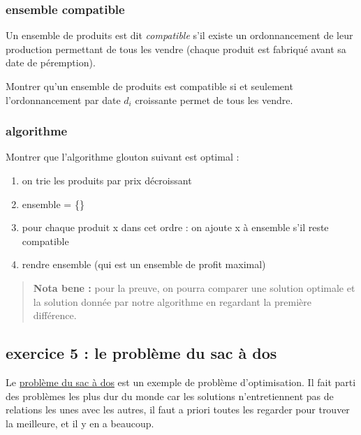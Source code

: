 \documentclass[
]{article}
\providecommand{\tightlist}{%
  \setlength{\itemsep}{0pt}\setlength{\parskip}{0pt}}
\begin{document}
\hypertarget{ensemble-compatible}{%
\subsubsection{ensemble compatible}\label{ensemble-compatible}}

Un ensemble de produits est dit \emph{compatible} s'il existe un
ordonnancement de leur production permettant de tous les vendre (chaque
produit est fabriqué avant sa date de péremption).

Montrer qu'un ensemble de produits est compatible si et seulement
l'ordonnancement par date \(d_i\) croissante permet de tous les vendre.

\hypertarget{algorithme}{%
\subsubsection{algorithme}\label{algorithme}}

Montrer que l'algorithme glouton suivant est optimal :

\begin{enumerate}
\def\labelenumi{\arabic{enumi}.}
\tightlist
\item
  on trie les produits par prix décroissant
\item
  ensemble = \{\}
\item
  pour chaque produit x dans cet ordre : on ajoute x à ensemble s'il
  reste compatible
\item
  rendre ensemble (qui est un ensemble de profit maximal)
\end{enumerate}

\begin{quote}
\textbf{Nota bene :} pour la preuve, on pourra comparer une solution
optimale et la solution donnée par notre algorithme en regardant la
première différence.
\end{quote}

\hypertarget{exercice-5-le-probluxe8me-du-sac-uxe0-dos}{%
\subsection{exercice 5 : le problème du sac à
dos}\label{exercice-5-le-probluxe8me-du-sac-uxe0-dos}}

Le
\href{https://fr.wikipedia.org/wiki/Probl\%C3\%A8me_du_sac_\%C3\%A0_dos}{problème
du sac à dos} est un exemple de problème d'optimisation. Il fait parti
des problèmes les plus dur du monde car les solutions n'entretiennent
pas de relations les unes avec les autres, il faut a priori toutes les
regarder pour trouver la meilleure, et il y en a beaucoup.
\end{document}
